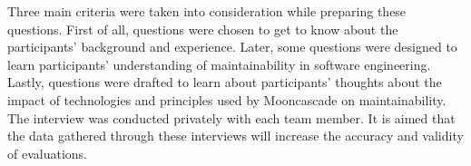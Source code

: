 Three main criteria were taken into consideration while preparing these questions. First of all, questions were chosen to get to know about the participants' background and experience. Later, some questions were designed to learn participants' understanding of maintainability in software engineering. Lastly, questions were drafted to learn about participants' thoughts about the impact of technologies and principles used by Mooncascade on maintainability. The interview was conducted privately with each team member.  It is aimed that the data gathered through these interviews will increase the accuracy and validity of evaluations.